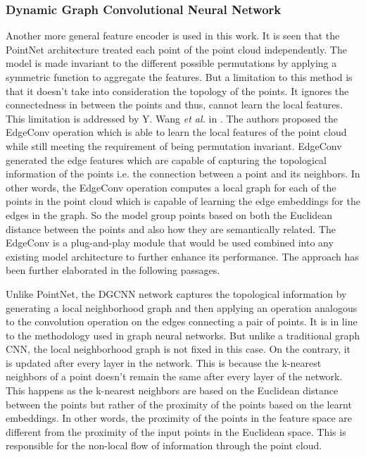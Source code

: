 \subsubsection*{Dynamic Graph Convolutional Neural Network}
Another more general feature encoder is used in this work. It is seen that the PointNet architecture treated each point of the point cloud independently. The model is made invariant to the different possible permutations by applying a symmetric function to aggregate the features. But a limitation to this method is that it doesn't take into consideration the topology of the points. It ignores the connectedness in between the points and thus, cannot learn the local features. This limitation is addressed by Y. Wang \textit{et al.} in \cite{wang2019dynamic}. The authors proposed the EdgeConv operation which is able to learn the local features of the point cloud while still meeting the requirement of being permutation invariant. EdgeConv generated the edge features which are capable of capturing the topological information of the points i.e. the connection between a point and its neighbors. In other words, the EdgeConv operation computes a local graph for each of the points in the point cloud which is capable of learning the edge embeddings for the edges in the graph. So the model group points based on both the Euclidean distance between the points and also how they are semantically related. The EdgeConv is a plug-and-play module that would be used combined into any existing model architecture to further enhance its performance. The approach has been further elaborated in the following passages.

\vspace{5mm}

Unlike PointNet, the \ac{DGCNN} network captures the topological information by generating a local neighborhood graph and then applying an operation analogous to the convolution operation on the edges connecting a pair of points. It is in line to the methodology used in graph neural networks. But unlike a traditional graph \ac{CNN}, the local neighborhood graph is not fixed in this case. On the contrary, it is updated after every layer in the network. This is because the k-nearest neighbors of a point doesn't remain the same after every layer of the network. This happens as the k-nearest neighbors are based on the Euclidean distance between the points but rather of the proximity of the points based on the learnt embeddings. In other words, the proximity of the points in the feature space are different from the proximity of the input points in the Euclidean space. This is responsible for the non-local flow of information through the point cloud. 

